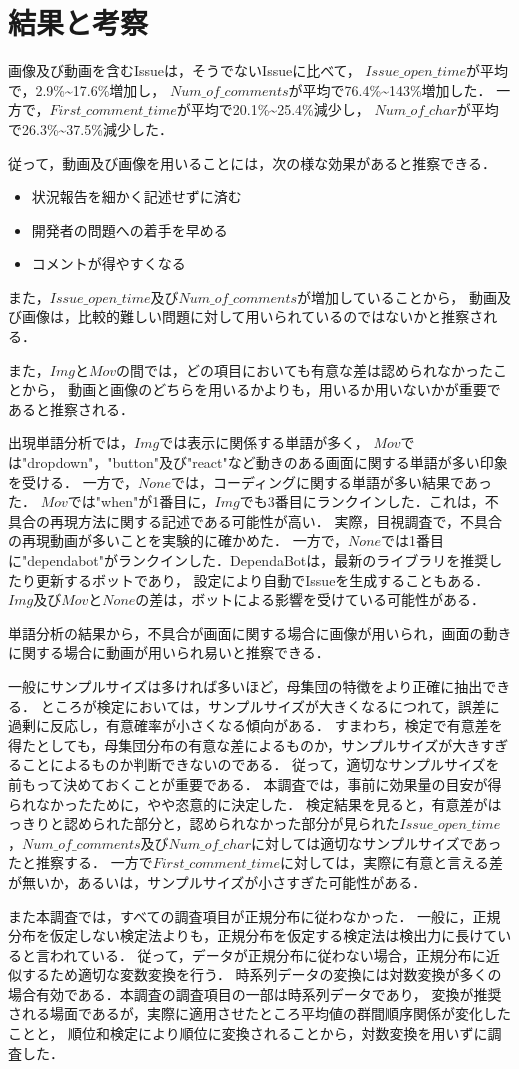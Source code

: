 \section{結果と考察\label{research}}

画像及び動画を含むIssueは，そうでないIssueに比べて，
$Issue\_open\_time$が平均で，2.9\%\textasciitilde17.6\%増加し，
$Num\_of\_comments$が平均で76.4\%\textasciitilde143\%増加した．
一方で，$First\_comment\_time$が平均で20.1\%\textasciitilde25.4\%減少し，
$Num\_of\_char$が平均で26.3\%\textasciitilde 37.5\%減少した．

従って，動画及び画像を用いることには，次の様な効果があると推察できる．
\begin{itemize}
  \item 状況報告を細かく記述せずに済む
  \item 開発者の問題への着手を早める
  \item コメントが得やすくなる
\end{itemize}
また，$Issue\_open\_time$及び$Num\_of\_comments$が増加していることから，
動画及び画像は，比較的難しい問題に対して用いられているのではないかと推察される．

また，$Img$と$Mov$の間では，どの項目においても有意な差は認められなかったことから，
動画と画像のどちらを用いるかよりも，用いるか用いないかが重要であると推察される．

出現単語分析では，$Img$では表示に関係する単語が多く，
$Mov$では"dropdown"，"button"及び"react"など動きのある画面に関する単語が多い印象を受ける．
一方で，$None$では，コーディングに関する単語が多い結果であった．
$Mov$では"when"が1番目に，$Img$でも3番目にランクインした．これは，不具合の再現方法に関する記述である可能性が高い．
実際，目視調査で，不具合の再現動画が多いことを実験的に確かめた．
一方で，$None$では1番目に"dependabot"がランクインした．DependaBotは，最新のライブラリを推奨したり更新するボットであり，
設定により自動でIssueを生成することもある．
$Img$及び$Mov$と$None$の差は，ボットによる影響を受けている可能性がある．

単語分析の結果から，不具合が画面に関する場合に画像が用いられ，画面の動きに関する場合に動画が用いられ易いと推察できる．

一般にサンプルサイズは多ければ多いほど，母集団の特徴をより正確に抽出できる．
ところが検定においては，サンプルサイズが大きくなるにつれて，誤差に過剰に反応し，有意確率が小さくなる傾向がある．
すまわち，検定で有意差を得たとしても，母集団分布の有意な差によるものか，サンプルサイズが大きすぎることによるものか判断できないのである．
従って，適切なサンプルサイズを前もって決めておくことが重要である．
本調査では，事前に効果量の目安が得られなかったために，やや恣意的に決定した．
検定結果を見ると，有意差がはっきりと認められた部分と，認められなかった部分が見られた$Issue\_open\_time$，$Num\_of\_comments$及び$Num\_of\_char$に対しては適切なサンプルサイズであったと推察する．
一方で$First\_comment\_time$に対しては，実際に有意と言える差が無いか，あるいは，サンプルサイズが小さすぎた可能性がある．

また本調査では，すべての調査項目が正規分布に従わなかった．
一般に，正規分布を仮定しない検定法よりも，正規分布を仮定する検定法は検出力に長けていると言われている．
従って，データが正規分布に従わない場合，正規分布に近似するため適切な変数変換を行う．
時系列データの変換には対数変換が多くの場合有効である．本調査の調査項目の一部は時系列データであり，
変換が推奨される場面であるが，実際に適用させたところ平均値の群間順序関係が変化したことと，
順位和検定により順位に変換されることから，対数変換を用いずに調査した．